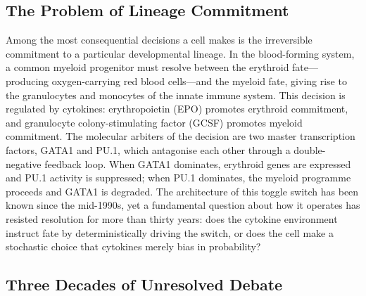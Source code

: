 
\subsection{The Problem of Lineage Commitment}

Among the most consequential decisions a cell makes is the irreversible commitment to a particular developmental lineage. In the blood-forming system, a common myeloid progenitor must resolve between the erythroid fate---producing oxygen-carrying red blood cells---and the myeloid fate, giving rise to the granulocytes and monocytes of the innate immune system. This decision is regulated by cytokines: erythropoietin (EPO) promotes erythroid commitment, and granulocyte colony-stimulating factor (GCSF) promotes myeloid commitment. The molecular arbiters of the decision are two master transcription factors, GATA1 and PU.1, which antagonise each other through a double-negative feedback loop. When GATA1 dominates, erythroid genes are expressed and PU.1 activity is suppressed; when PU.1 dominates, the myeloid programme proceeds and GATA1 is degraded. The architecture of this toggle switch has been known since the mid-1990s, yet a fundamental question about how it operates has resisted resolution for more than thirty years: does the cytokine environment instruct fate by deterministically driving the switch, or does the cell make a stochastic choice that cytokines merely bias in probability?

\subsection{Three Decades of Unresolved Debate}

